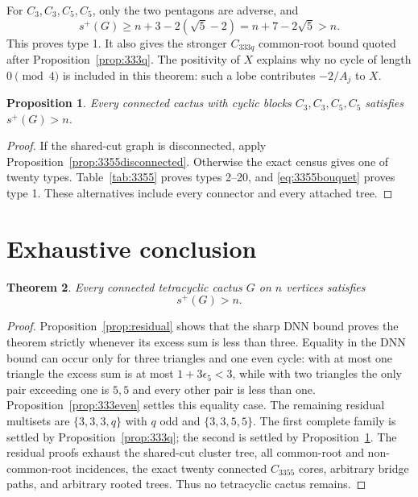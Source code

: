 \documentclass[11pt]{article}
\newtheorem{theorem}{Theorem}[section]
\newtheorem{proposition}[theorem]{Proposition}
\theoremstyle{remark}
\begin{document}
For $C_3,C_3,C_5,C_5$, only the two pentagons are adverse, and
\begin{equation}\label{eq:3355bouquet}
 s^+(G)\geq n+3-2(\sqrt5-2)=n+7-2\sqrt5>n.
\end{equation}
This proves type 1.  It also gives the stronger $C_{333q}$ common-root bound
quoted after Proposition~\ref{prop:333q}.  The positivity of $X$ explains why no cycle of
length $0\pmod4$ is included in this theorem: such a lobe contributes
$-2/A_j$ to $X$.

\begin{proposition}\label{prop:3355}
Every connected cactus with cyclic blocks $C_3,C_3,C_5,C_5$ satisfies
$s^+(G)>n$.
\end{proposition}

\begin{proof}
If the shared-cut graph is disconnected, apply
Proposition~\ref{prop:3355disconnected}.  Otherwise the exact census gives one
of twenty types.  Table~\ref{tab:3355} proves types 2--20, and
\eqref{eq:3355bouquet} proves type 1.  These alternatives include every
connector and every attached tree.
\end{proof}

\section{Exhaustive conclusion}

\begin{theorem}\label{thm:main}
Every connected tetracyclic cactus $G$ on $n$ vertices satisfies
\[
 \boxed{s^+(G)>n}.
\]
\end{theorem}

\begin{proof}
Proposition~\ref{prop:residual} shows that the sharp DNN bound proves the
theorem strictly whenever its excess sum is less than three.  Equality in the
DNN bound can occur only for three triangles and one even cycle: with at most
one triangle the excess sum is at most $1+3\epsilon_5<3$, while with two
triangles the only pair exceeding one is $5,5$ and every other pair is less
than one.  Proposition~\ref{prop:333even} settles this equality case.  The
remaining residual multisets are
$\{3,3,3,q\}$ with $q$ odd and $\{3,3,5,5\}$.  The first complete family is
settled by Proposition~\ref{prop:333q}; the second is settled by
Proposition~\ref{prop:3355}.  The residual proofs exhaust the shared-cut
cluster tree, all common-root and non-common-root incidences, the exact twenty
connected $C_{3355}$ cores, arbitrary bridge paths, and arbitrary rooted trees.
Thus no tetracyclic cactus remains.
\end{proof}
\end{document}
